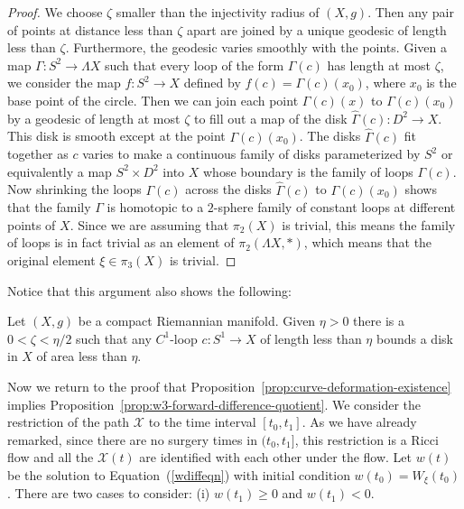 \begin{proof}
We choose $\zeta$ smaller than the injectivity radius of $(X,g)$.
Then any pair of points at distance less than $\zeta$ apart are
joined by a unique geodesic of length less than $\zeta$.
Furthermore, the geodesic varies smoothly with the points. Given a
map $\Gamma\colon S^2\to \Lambda X$ such that every loop of the form
$\Gamma(c)$ has length at most $\zeta$, we consider the map $f\colon
S^2\to X$ defined by $f(c)=\Gamma(c)(x_0)$, where $x_0$ is the base
point of the circle. Then we can join each point $\Gamma(c)(x)$ to
$\Gamma(c)(x_0)$ by a geodesic of length at most $\zeta$ to fill out
a map of the disk $\widehat \Gamma(c)\colon D^2\to X$. This disk is
smooth except at the point $\Gamma(c)(x_0)$. The disks
$\widehat\Gamma(c)$ fit together as $c$ varies to make a continuous
family of disks parameterized by $S^2$ or equivalently a map
$S^2\times D^2$ into $X$ whose boundary is the family of loops
$\Gamma(c)$. Now shrinking the loops $\Gamma(c)$ across the disks
$\hat\Gamma(c)$ to $\Gamma(c)(x_0)$ shows that the family $\Gamma$
is homotopic to a $2$-sphere family of constant loops at different
points of $X$. Since we are assuming that $\pi_2(X)$ is trivial,
this means the family of loops is in fact trivial as an element of
$\pi_2(\Lambda X,*)$, which  means that the original element $\xi\in
\pi_3(X)$ is trivial.
\end{proof}

Notice that this argument also shows the following:

\begin{corollary}
\label{cor:short-loop-bounds-small-disk}
\label{shlnsharea}
Let $(X,g)$ be a compact Riemannian manifold. Given $\eta>0$ there is a
$0<\zeta<\eta/2$ such that any $C^1$-loop $c\colon S^1\to X$ of length less
than $\eta$ bounds a disk in $X$ of area less than $\eta$.
\end{corollary}

Now we return to the proof that Proposition~\ref{prop:curve-deformation-existence} implies
Proposition~\ref{prop:w3-forward-difference-quotient}. We consider the restriction of the
path ${\mathcal X}$ to the time interval $[t_0,t_1]$. As we have
already remarked, since there are no surgery times in $(t_0,t_1]$,
this restriction is a Ricci flow and all the ${\mathcal X}(t)$ are
identified with each other under the flow.
 Let $w(t)$ be the solution to Equation~(\ref{wdiffeqn})
with initial condition $w(t_0)=W_\xi(t_0)$. There are two cases to
consider: (i) $w(t_1)\ge 0$ and $w(t_1)< 0$.

